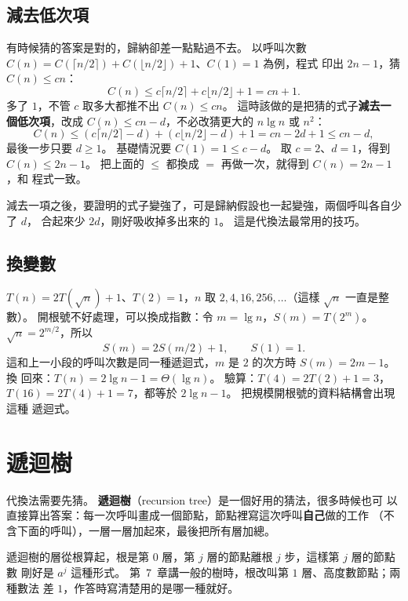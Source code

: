 \subsection{減去低次項}

有時候猜的答案是對的，歸納卻差一點點過不去。 以呼叫次數
$C(n) = C(\lceil n/2 \rceil) + C(\lfloor n/2 \rfloor) + 1$、$C(1) = 1$ 為例，程式
印出 $2n - 1$，猜 $C(n) \le cn$：
\[
C(n) \le c \lceil n/2 \rceil + c \lfloor n/2 \rfloor + 1 = cn + 1.
\]
多了 $1$，不管 $c$ 取多大都推不出 $C(n) \le cn$。 這時該做的是把猜的式子\textbf{減去一個低次項}，改成
$C(n) \le cn - d$，不必改猜更大的 $n \lg n$ 或 $n^2$：
\[
C(n) \le (c \lceil n/2 \rceil - d) + (c \lfloor n/2 \rfloor - d) + 1 = cn - 2d + 1
\le cn - d,
\]
最後一步只要 $d \ge 1$。 基礎情況要 $C(1) = 1 \le c - d$。 取 $c = 2$、$d = 1$，得到
$C(n) \le 2n - 1$。 把上面的 $\le$ 都換成 $=$ 再做一次，就得到 $C(n) = 2n - 1$，和
程式一致。

減去一項之後，要證明的式子變強了，可是歸納假設也一起變強，兩個呼叫各自少了 $d$，
合起來少 $2d$，剛好吸收掉多出來的 $1$。 這是代換法最常用的技巧。

\subsection{換變數}

$T(n) = 2T(\sqrt{n}) + 1$、$T(2) = 1$，$n$ 取 $2, 4, 16, 256, \ldots$（這樣 $\sqrt{n}$
一直是整數）。 開根號不好處理，可以換成指數：令 $m = \lg n$，$S(m) = T(2^m)$。
$\sqrt{n} = 2^{m/2}$，所以
\[
S(m) = 2S(m/2) + 1, \qquad S(1) = 1.
\]
這和上一小段的呼叫次數是同一種遞迴式，$m$ 是 $2$ 的次方時 $S(m) = 2m - 1$。 換
回來：$T(n) = 2 \lg n - 1 = \Theta(\lg n)$。 驗算：$T(4) = 2T(2) + 1 = 3$，
$T(16) = 2T(4) + 1 = 7$，都等於 $2 \lg n - 1$。 把規模開根號的資料結構會出現這種
遞迴式。

\section{遞迴樹}
\label{sec:rec-tree}

代換法需要先猜。 \textbf{遞迴樹}（recursion tree）是一個好用的猜法，很多時候也可
以直接算出答案：每一次呼叫畫成一個節點，節點裡寫這次呼叫\textbf{自己}做的工作
（不含下面的呼叫），一層一層加起來，最後把所有層加總。

遞迴樹的層從根算起，根是第 $0$ 層，第 $j$ 層的節點離根 $j$ 步，這樣第 $j$ 層的節點數
剛好是 $a^j$ 這種形式。 第~7~章講一般的樹時，根改叫第 $1$ 層、高度數節點；兩種數法
差 $1$，作答時寫清楚用的是哪一種就好。

